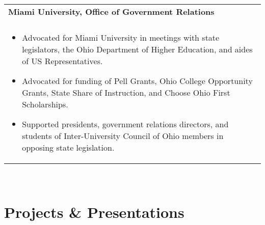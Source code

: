 \documentclass[letterpaper,10pt]{article} %
\begin{document}
\begin{tabular*}{\linewidth}{@{\extracolsep{\fill}} lr }
\textbf{Miami University, Office of Government Relations} & \scriptsize\bfseries\color{sectioncolour}{Oxford, OH}\\
\footnotesize\bfseries\color{sectioncolour}{Government Relations Intern} & \scriptsize\bfseries\color{sectioncolour}{August 2021 - May 2024}\\
\multicolumn{2}{p{\linewidth}}{
    \scriptsize{\vspace{-0.1in}\begin{itemize}
        \item Advocated for Miami University in meetings with state legislators, the Ohio Department of Higher Education, and aides of US Representatives.
        \item Advocated for funding of Pell Grants, Ohio College Opportunity Grants, State Share of Instruction, and Choose Ohio First Scholarships.
        \item Supported presidents, government relations directors, and students of Inter-University Council of Ohio members in opposing state legislation.
    \end{itemize}\vspace{-0.in}}
}\\
\end{tabular*}\vspace{-0.1in}\\

\section{Projects \& Presentations}
\end{document}

